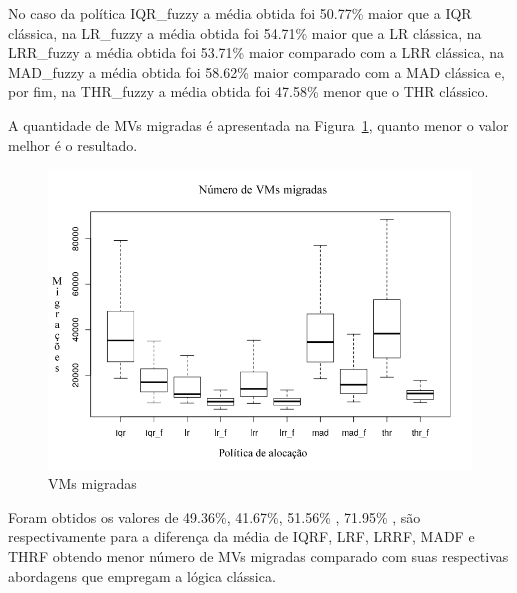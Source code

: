 \documentclass[tcc,capa]{texufpel}
\begin{document}
No caso da política IQR\_fuzzy a média obtida foi 50.77\% maior que a IQR clássica, na LR\_fuzzy a média obtida foi 54.71\% maior que a LR clássica, na LRR\_fuzzy a média obtida foi 53.71\% maior comparado com a LRR clássica, na MAD\_fuzzy a média obtida foi 58.62\% maior comparado com a MAD clássica e, por fim, na THR\_fuzzy a média obtida foi 47.58\% menor que o THR clássico.


A quantidade de MVs migradas é apresentada na Figura~\ref{fig:vm_migradas}, quanto menor o valor melhor é o resultado. 

\begin{figure}[h]
\centering
\includegraphics[scale=0.55]{images/resultados/vms_migradas.png} %
\caption{VMs migradas}
\label{fig:vm_migradas}
\end{figure}

Foram obtidos os valores de 49.36\%, 41.67\%, 51.56\% , 71.95\% , são respectivamente para a diferença da média de IQRF, LRF, LRRF, MADF e THRF obtendo menor número de MVs migradas comparado com suas respectivas abordagens que empregam a lógica clássica.

\newpage
\end{document}
